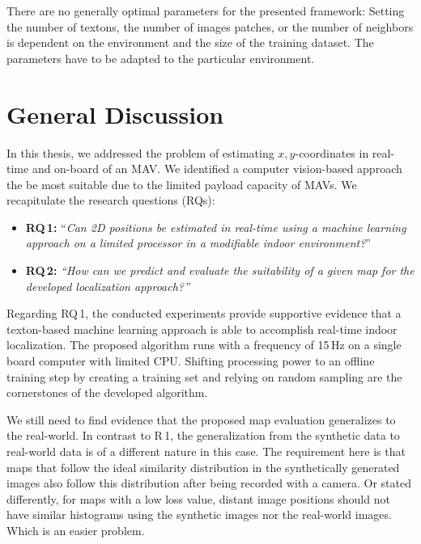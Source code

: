 \documentclass[11pt]{report}
\begin{document}
There are no generally optimal parameters for the presented framework:
Setting the number of textons, the number of images patches, or the
number of neighbors is dependent on the environment and the size of
the training dataset. The parameters have to be adapted to the
particular environment.

\section{General Discussion}
\label{sec:generaldiscussion}

In this thesis, we addressed the problem of estimating
$x,y$-coordinates in real-time and on-board of an MAV. We identified a
computer vision-based approach the be most suitable due to the limited
payload capacity of MAVs. We recapitulate the research questions
(RQs):

\begin{itemize}
\item \textbf{RQ\,1:} ``\emph{Can 2D positions be estimated in real-time using a
    machine learning approach on a limited processor in a modifiable
    indoor environment?}''
\item \textbf{RQ\,2:} \emph{``How can we predict and evaluate the suitability of a
    given map for the developed localization approach?''} 
\end{itemize}

Regarding RQ\,1, the conducted experiments provide supportive evidence
that a texton-based machine learning approach is able to accomplish
real-time indoor localization. The proposed algorithm runs with a
frequency of 15\,Hz on a single board computer with limited
CPU. Shifting processing power to an offline training step by creating
a training set and relying on random sampling are the cornerstones of
the developed algorithm.



We still need to find evidence that the proposed map evaluation
generalizes to the real-world. In contrast to R\,1, the generalization
from the synthetic data to real-world data is of a different nature in
this case. The requirement here is that maps that follow the ideal
similarity distribution in the synthetically generated images also
follow this distribution after being recorded with a camera. Or stated
differently, for maps with a low loss value, distant image positions
should not have similar histograms using the synthetic images nor the
real-world images. Which is an easier problem.
\end{document}
